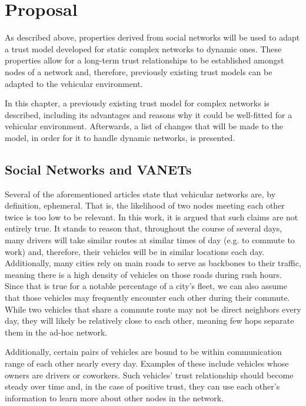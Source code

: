 \chapter{Proposal}
\label{chap:proposal}

As described above, properties derived from social networks will be used to adapt a trust model developed for static complex networks to dynamic ones.
These properties allow for a long-term trust relationships to be established amongst nodes of a network and, therefore, previously existing trust models can be adapted to the vehicular environment.

In this chapter, a previously existing trust model for complex networks is described, including its advantages and reasons why it could be well-fitted for a vehicular environment.
Afterwards, a list of changes that will be made to the model, in order for it to handle dynamic networks, is presented.

\section{Social Networks and VANETs}
Several of the aforementioned articles state that vehicular networks are, by definition, ephemeral.
That is, the likelihood of two nodes meeting each other twice is too low to be relevant.
In this work, it is argued that such claims are not entirely true.
It stands to reason that, throughout the course of several days, many drivers will take similar routes at similar times of day (e.g. to commute to work) and, therefore, their vehicles will be in similar locations each day.
Additionally, many cities rely on main roads to serve as backbones to their traffic, meaning there is a high density of vehicles on those roads during rush hours.
Since that is true for a notable percentage of a city's fleet, we can also assume that those vehicles may frequently encounter each other during their commute.
While two vehicles that share a commute route may not be direct neighbors every day, they will likely be relatively close to each other, meaning few hops separate them in the ad-hoc network.

Additionally, certain pairs of vehicles are bound to be within communication range of each other nearly every day.
Examples of these include vehicles whose owners are drivers or coworkers.
Such vehicles' trust relationship should become steady over time and, in the case of positive trust, they can use each other's information to learn more about other nodes in the network.

